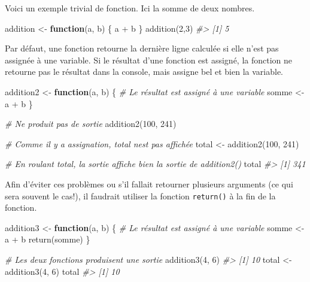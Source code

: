 \documentclass[
]{book}
\newenvironment{Shaded}{}{}
\newcommand{\CommentTok}[1]{\textit{#1}}
\newcommand{\ControlFlowTok}[1]{\textbf{#1}}
\newcommand{\DecValTok}[1]{#1}
\newcommand{\FunctionTok}[1]{#1}
\newcommand{\NormalTok}[1]{#1}
\newcommand{\OtherTok}[1]{#1}
\newcommand{\SpecialCharTok}[1]{#1}
\begin{document}
Voici un exemple trivial de fonction. Ici la somme de deux nombres.

\begin{Shaded}
\begin{Highlighting}[]
\NormalTok{addition }\OtherTok{\textless{}{-}} \ControlFlowTok{function}\NormalTok{(a, b) \{}
\NormalTok{  a }\SpecialCharTok{+}\NormalTok{ b}
\NormalTok{\}}
\FunctionTok{addition}\NormalTok{(}\DecValTok{2}\NormalTok{,}\DecValTok{3}\NormalTok{)}
\CommentTok{\#\textgreater{} [1] 5}
\end{Highlighting}
\end{Shaded}

Par défaut, une fonction retourne la dernière ligne calculée si elle n'est pas assignée à une variable. Si le résultat d'une fonction est assigné, la fonction ne retourne pas le résultat dans la console, mais assigne bel et bien la variable.

\begin{Shaded}
\begin{Highlighting}[]
\NormalTok{addition2 }\OtherTok{\textless{}{-}} \ControlFlowTok{function}\NormalTok{(a, b) \{}
  \CommentTok{\# Le résultat est assigné à une variable}
\NormalTok{  somme }\OtherTok{\textless{}{-}}\NormalTok{ a }\SpecialCharTok{+}\NormalTok{ b}
\NormalTok{\}}

\CommentTok{\# Ne produit pas de sortie}
\FunctionTok{addition2}\NormalTok{(}\DecValTok{100}\NormalTok{, }\DecValTok{241}\NormalTok{)}

\CommentTok{\# Comme il y a assignation, total n\textquotesingle{}est pas affichée}
\NormalTok{total }\OtherTok{\textless{}{-}} \FunctionTok{addition2}\NormalTok{(}\DecValTok{100}\NormalTok{, }\DecValTok{241}\NormalTok{)}

\CommentTok{\# En roulant total, la sortie affiche bien la sortie de addition2()}
\NormalTok{total}
\CommentTok{\#\textgreater{} [1] 341}
\end{Highlighting}
\end{Shaded}

Afin d'éviter ces problèmes ou s'il fallait retourner plusieurs arguments (ce qui sera souvent le cas!), il faudrait utiliser la fonction \texttt{return()} à la fin de la fonction.

\begin{Shaded}
\begin{Highlighting}[]
\NormalTok{addition3 }\OtherTok{\textless{}{-}} \ControlFlowTok{function}\NormalTok{(a, b) \{}
  \CommentTok{\# Le résultat est assigné à une variable}
\NormalTok{  somme }\OtherTok{\textless{}{-}}\NormalTok{ a }\SpecialCharTok{+}\NormalTok{ b}
  \FunctionTok{return}\NormalTok{(somme)}
\NormalTok{\}}

\CommentTok{\# Les deux fonctions produisent une sortie}
\FunctionTok{addition3}\NormalTok{(}\DecValTok{4}\NormalTok{, }\DecValTok{6}\NormalTok{)}
\CommentTok{\#\textgreater{} [1] 10}
\NormalTok{total }\OtherTok{\textless{}{-}} \FunctionTok{addition3}\NormalTok{(}\DecValTok{4}\NormalTok{, }\DecValTok{6}\NormalTok{)}
\NormalTok{total}
\CommentTok{\#\textgreater{} [1] 10}
\end{Highlighting}
\end{Shaded}
\end{document}
